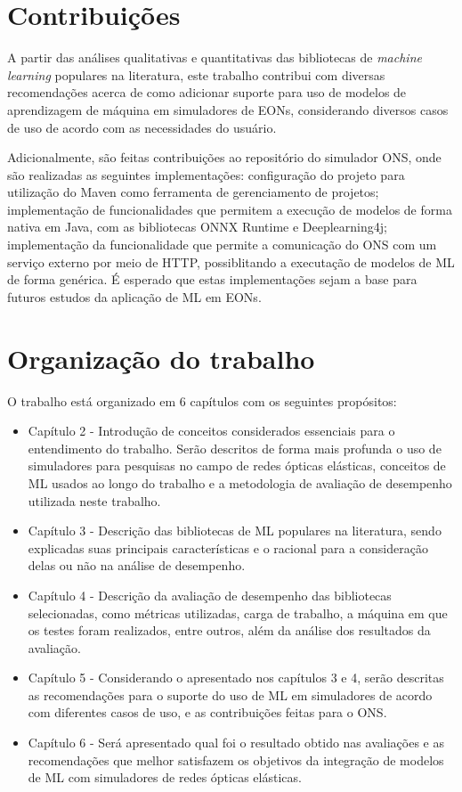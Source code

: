 \section{Contribuições}
\label{intro-contributions}

A partir das análises qualitativas e quantitativas das bibliotecas de \textit{machine learning} populares na literatura, este trabalho contribui com diversas recomendações acerca de como adicionar suporte para uso de modelos de aprendizagem de máquina em simuladores de EONs, considerando diversos casos de uso de acordo com as necessidades do usuário.

Adicionalmente, são feitas contribuições ao repositório do simulador ONS, onde são realizadas as seguintes implementações: configuração do projeto para utilização do Maven como ferramenta de gerenciamento de projetos; implementação de funcionalidades que permitem a execução de modelos de forma nativa em Java, com as bibliotecas ONNX Runtime e Deeplearning4j; implementação da funcionalidade que permite a comunicação do ONS com um serviço externo por meio de HTTP, possiblitando a executação de modelos de ML de forma genérica. É esperado que estas implementações sejam a base para futuros estudos da aplicação de ML em EONs.

\section{Organização do trabalho}
\label{intro-org}

O trabalho está organizado em 6 capítulos com os seguintes propósitos:

\begin{itemize}
  \item Capítulo 2 - Introdução de conceitos considerados essenciais para o entendimento do trabalho. Serão descritos de forma mais profunda o uso de simuladores para pesquisas no campo de redes ópticas elásticas, conceitos de ML usados ao longo do trabalho e a metodologia de avaliação de desempenho utilizada neste trabalho.

  \item Capítulo 3 - Descrição das bibliotecas de ML populares na literatura, sendo explicadas suas principais características e o racional para a consideração delas ou não na análise de desempenho.

  \item Capítulo 4 - Descrição da avaliação de desempenho das bibliotecas selecionadas, como métricas utilizadas, carga de trabalho, a máquina em que os testes foram realizados, entre outros, além da análise dos resultados da avaliação.

  \item Capítulo 5 - Considerando o apresentado nos capítulos 3 e 4, serão descritas as recomendações para o suporte do uso de ML em simuladores de acordo com diferentes casos de uso, e as contribuições feitas para o \acrfull{ONS}.

  \item Capítulo 6 - Será apresentado qual foi o resultado obtido nas avaliações e as recomendações que melhor satisfazem os objetivos da integração de modelos de ML com simuladores de redes ópticas elásticas.
\end{itemize}
